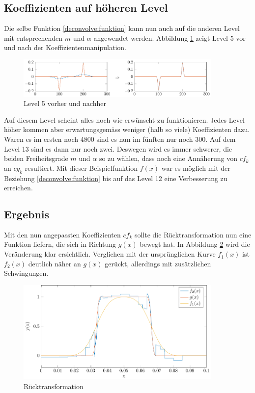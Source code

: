 \subsection{Koeffizienten auf höheren Level}
Die selbe Funktion \eqref{deconvolve:funktion} kann nun auch auf die anderen Level mit entsprechenden $m$ und $\alpha$ angewendet werden.
Abbildung \ref{deconvolve:level5} zeigt Level 5 vor und nach der Koeffizientenmanipulation.
\begin{figure}[h]
\centering
\includegraphics[width=0.9\textwidth]{./papers/deconvolve/pictures/level/level5.pdf}
\caption{Level 5 vorher und nachher\label{deconvolve:level5}}
\end{figure}
Auf diesem Level scheint alles noch wie erwünscht zu funktionieren.
Jedes Level höher kommen aber erwartungsgemäss weniger (halb so viele) Koeffizienten dazu.
Waren es im ersten noch 4800 sind es nun im fünften nur noch 300.
Auf dem Level 13 sind es dann nur noch zwei.
Deswegen wird es immer schwerer, die beiden Freiheitsgrade $m$ und $\alpha$ so zu wählen, dass noch eine Annäherung von $cf_k$ an $cg_k$ resultiert. Mit dieser Beispielfunktion $f(x)$ war es möglich mit der Beziehung \eqref{deconvolve:funktion} bis auf das Level 12 eine Verbesserung zu erreichen.

\subsection{Ergebnis}
Mit den nun angepassten Koeffizienten $cf_k$ sollte die Rücktransformation nun eine Funktion liefern, die sich in Richtung $g(x)$ bewegt hat.
In Abbildung \ref{deconvolve:result_1d} wird die Veränderung klar ersichtlich.
Verglichen mit der ursprünglichen Kurve $f_1(x)$ ist $f_2(x)$ deutlich näher an $g(x)$ gerückt, allerdings mit zusätzlichen Schwingungen.
\begin{figure}[h]
\centering
\includegraphics[width=0.9\textwidth]{./papers/deconvolve/pictures/result_1d.pdf}
\caption{Rücktransformation\label{deconvolve:result_1d}}
\end{figure}

